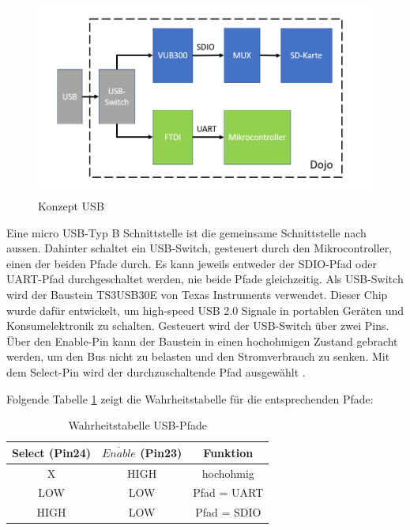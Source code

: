 \begin{figure}[h]
	\centering
	\includegraphics[width=\textwidth]{Bilder/Konzept_USB.PNG}
	\caption{Konzept USB}
	\label{Konzept_USB}
\end{figure}

Eine micro USB-Typ B Schnittstelle ist die gemeinsame Schnittstelle nach aussen. Dahinter schaltet ein USB-Switch, gesteuert durch den Mikrocontroller, einen der beiden Pfade durch. Es kann jeweils entweder der SDIO-Pfad oder UART-Pfad durchgeschaltet werden, nie beide Pfade gleichzeitig.\newline
Als USB-Switch wird der Baustein TS3USB30E von Texas Instruments verwendet. Dieser Chip wurde dafür entwickelt, um high-speed USB 2.0 Signale in portablen Geräten und Konsumelektronik zu schalten. Gesteuert wird der USB-Switch über zwei Pins. Über den Enable-Pin kann der Baustein in einen hochohmigen Zustand gebracht werden, um den Bus nicht zu belasten und den Stromverbrauch zu senken. Mit dem Select-Pin wird der durchzuschaltende Pfad ausgewählt \cite{DatasheetTS3USB}.

Folgende Tabelle \ref{truth_table_usb} zeigt die Wahrheitstabelle für die entsprechenden Pfade:
\begin{table}[h]
	\centering
	\begin{tabular}{|c|c|c|} 
		Select (Pin24) & $\overline{Enable}$ (Pin23) & Funktion \\ 
		\hline 
		X & HIGH & hochohmig \\ 
		\hline 
		LOW & LOW & Pfad = UART \\ 
		\hline 
		HIGH & LOW & Pfad = SDIO \\ 
	\end{tabular} 
	\caption{Wahrheitstabelle USB-Pfade}
	\label{truth_table_usb}
\end{table}

